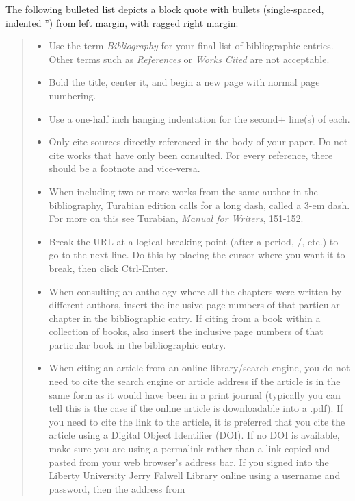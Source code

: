 \documentclass[raggedright]{turabian-researchpaper}
\begin{document}
The following bulleted list depicts a block quote with bullets (single-spaced,
indented '') from left margin, with ragged right margin:

\begin{quotation}
\mbox{}\vspace{-\baselineskip}
\begin{itemize}
\item Use the term \textit{Bibliography} for your final list of bibliographic
  entries. Other terms such as \textit{References} or \textit{Works Cited} are
  not acceptable.
\item Bold the title, center it, and begin a new page with normal page
  numbering.
\item Use a one-half inch hanging indentation for the second+ line(s) of each.
\item Only cite sources directly referenced in the body of your paper. Do not
  cite works that have only been consulted. For every reference, there should be
  a footnote and vice-versa.
\item When including two or more works from the same author in the bibliography,
  Turabian  edition calls for a long dash, called a 3-em dash. For more
  on this see Turabian, \textit{Manual for Writers}, 151-152.
\item Break the URL at a logical breaking point (after a period, /, etc.) to go
  to the next line. Do this by placing the cursor where you want it to break,
  then click Ctrl-Enter.
\item When consulting an anthology where all the chapters were written by
  different authors, insert the inclusive page numbers of that particular
  chapter in the bibliographic entry. If citing from a book within a collection
  of books, also insert the inclusive page numbers of that particular book in
  the bibliographic entry.
\item When citing an article from an online library/search engine, you do not
  need to cite the search engine or article address if the article is in the
  same form as it would have been in a print journal (typically you can tell
  this is the case if the online article is downloadable into a .pdf). If you
  need to cite the link to the article, it is preferred that you cite the
  article using a Digital Object Identifier (DOI). If no DOI is available, make
  sure you are using a permalink rather than a link copied and pasted from your
  web browser's address bar. If you signed into the Liberty University Jerry
  Falwell Library online using a username and password, then the address from

\end{itemize}
\end{quotation}
\end{document}
